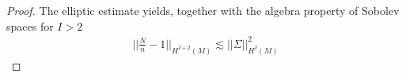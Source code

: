 \documentclass{amsart}
\newtheorem{remark}{Remark}
\begin{document}
\begin{proof}
\noindent The elliptic estimate yields, together with the algebra property of Sobolev spaces for $I>2$
\begin{align}
 ||\frac{N}{n}-1||_{H^{I+2}(M)}\lesssim ||\Sigma||^{2}_{H^{I}(M)}
\end{align}
\end{proof}
\end{document}

